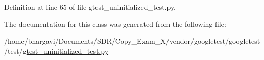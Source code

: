 Definition at line 65 of file gtest\+\_\+uninitialized\+\_\+test.\+py.



The documentation for this class was generated from the following file\+:\begin{DoxyCompactItemize}
\item 
/home/bhargavi/\+Documents/\+S\+D\+R/\+Copy\+\_\+\+Exam\+\_\+X/vendor/googletest/googletest/test/\hyperlink{gtest__uninitialized__test_8py}{gtest\+\_\+uninitialized\+\_\+test.\+py}\end{DoxyCompactItemize}
